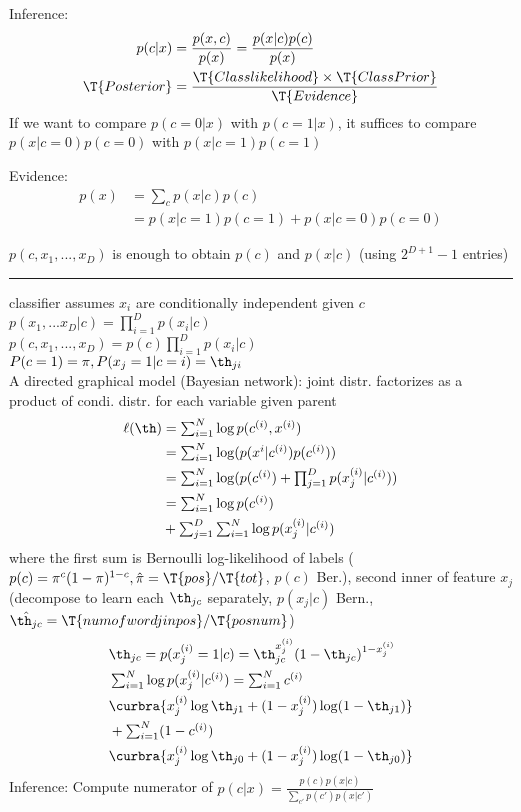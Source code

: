 \documentclass[10pt]{CheatSheet/hw}
\begin{document}
\begin{multicols*}{5}
Inference: \begin{align*}
    p(c|x) &= \frac{p(x,c)}{p(x)} = \frac{p(x|c) p(c)}{p(x)}\\
    \T{Posterior} &= \frac{\T{Class likelihood} \times \T{Class Prior}}{\T{Evidence}}
\end{align*}
If we want to compare $p(c=0|x)$ with $p(c=1|x)$, it suffices to compare $p(x|c=0)p(c=0)$ with $p(x|c=1)p(c=1)$

Evidence: \begin{align*}
    p(x) &=\textstyle\sum_c p(x|c)p(c)\\
    &= p(x|c=1)p(c=1)+p(x|c=0)p(c=0)
\end{align*}

$p(c,x_1,...,x_D)$ is enough to obtain $p(c)$ and $p(x|c)$ (using $2^{D+1}-1$ entries)
\rule{\linewidth}{0.4pt}
 classifier assumes $x_i$ are conditionally independent given $c$\\
$p(x_1,...x_D|c)=\prod_{i=1}^D p(x_i|c)$\\
$p(c,x_1,...,x_D)=p(c)\prod_{i=1}^D p(x_i|c)$\\
$P(c=1)=\pi, P(x_j=1|c=i)=\th_{ji}$\\
A directed graphical model (Bayesian network): joint distr. factorizes as a product of condi. distr. for each variable given parent
\begin{align*}
    \ell(\th) &=\textstyle\sum_{i=1}^N \log p(c^{(i)},x^{(i)})\\
    &=\textstyle\sum_{i=1}^N \log (p(x^{i}|c^{(i)})p(c^{(i)}))\\
    &=\textstyle\sum_{i=1}^N \log (p(c^{(i)})+\textstyle\prod_{j=1}^D p(x_j^{(i)}|c^{(i)}))\\
    &=\textstyle\sum_{i=1}^N \log p(c^{(i)}) \\
    &+\textstyle\sum_{j=1}^D \textstyle\sum_{i=1}^N \log p(x_j^{(i)}|c^{(i)})
\end{align*}
where the first sum is Bernoulli log-likelihood of labels ($p(c)=\pi^c(1-\pi)^{1-c}, \hat{\pi}=\T{pos}/\T{tot}$, $p(c)$ Ber.), second inner of feature $x_j$ (decompose to learn each $\th_{jc}$ separately, $p(x_j|c)$ Bern., $\hat{\th_{jc}}=\T{num of word j in pos}/\T{pos num}$)
\begin{align*}
    &\th_{jc}=p(x_j^{(i)}=1|c)=\th_{jc}^{x_j^{(i)}}(1-\th_{jc})^{1-x_j^{(i)}}\\
    &\textstyle\sum_{i=1}^N \log p(x_j^{(i)}|c^{(i)})=\textstyle\sum_{i=1}^N c^{(i)}\\
    &\curbra{x_j^{(i)}\log\th_{j1}+(1-x_j^{(i)})\log(1-\th_{j1})}\\
    &+\textstyle\sum_{i=1}^N(1-c^{(i)})\\
    &\curbra{x_j^{(i)}\log\th_{j0}+(1-x_j^{(i)})\log(1-\th_{j0})}
\end{align*}
Inference: Compute numerator of $p(c|x)=\frac{p(c)p(x|c)}{\sum_{c'}p(c')p(x|c')}$


\end{multicols*}
\end{document}
